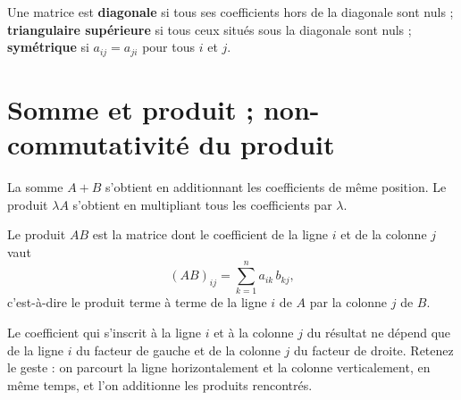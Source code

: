 \begin{definition}
Une matrice est \textbf{diagonale} si tous ses coefficients hors de la
diagonale sont nuls ; \textbf{triangulaire supérieure} si tous ceux situés
sous la diagonale sont nuls ; \textbf{symétrique} si $a_{ij} = a_{ji}$ pour
tous $i$ et $j$.
\end{definition}

\section{Somme et produit ; non-commutativité du produit}

\begin{definition}
La somme $A+B$ s'obtient en additionnant les coefficients de même position.
Le produit $\lambda A$ s'obtient en multipliant tous les coefficients par
$\lambda$.
\end{definition}

\begin{definition}
Le produit $AB$ est la matrice dont le coefficient de la ligne $i$ et de la
colonne $j$ vaut
\[
  (AB)_{ij} = \sum_{k=1}^{n} a_{ik}\,b_{kj},
\]
c'est-à-dire le produit terme à terme de la ligne $i$ de $A$ par la colonne
$j$ de $B$.
\end{definition}

\begin{visualisation}
\begin{center}
\end{center}

Le coefficient qui s'inscrit à la ligne $i$ et à la colonne $j$ du résultat ne
dépend que de la ligne $i$ du facteur de gauche et de la colonne $j$ du facteur
de droite. Retenez le geste : on parcourt la ligne horizontalement et la
colonne verticalement, en même temps, et l'on additionne les produits
rencontrés.
\end{visualisation}

